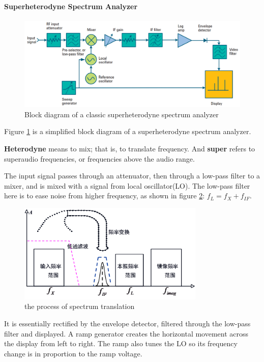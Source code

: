 \paragraph{Superheterodyne Spectrum Analyzer}

\begin{figure}
  \centering
  \includegraphics[width=4.5in]{fig/fig_spe_anlyzer.png}
  \caption{Block diagram of a classic superheterodyne spectrum analyzer}\label{fig_spe_anlyzer}
\end{figure}

Figure \ref{fig_spe_anlyzer} is a simplified block diagram of a superheterodyne spectrum analyzer.

\textbf{Heterodyne} means to mix; that is, to translate frequency. And \textbf{super} refers to superaudio frequencies, or frequencies above the audio range.

The input signal passes through an attenuator, then through a low-pass filter to a mixer, and is mixed with a signal from local oscillator(LO). The low-pass filter here is to ease noise from higher frequency, as shown in figure \ref{fig_spectrum_analyser}: $f_L = f_X + f_{IF}$.

\begin{figure}
  \centering
  \includegraphics[width=3.5in]{fig/fig_spectrum_analyser.png}
  \caption{the process of spectrum translation}\label{fig_spectrum_analyser}
\end{figure}

It is essentially rectified by the envelope detector, filtered through the low-pass filter and displayed. A ramp generator creates the horizontal movement across the display from left to right. The ramp also tunes the LO so its frequency change is in proportion to the ramp voltage.

